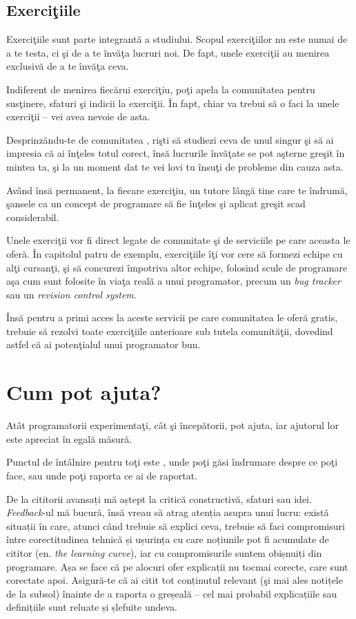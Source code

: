 {}
\subsection*{Exerciţiile}

Exerciţiile sunt parte integrantă a studiului. Scopul exerciţiilor nu
este numai de a te testa, ci şi de a te învăţa lucruri noi. De fapt,
unele exerciţii au menirea exclusivă de a te învăţa ceva.

Indiferent de menirea fiecărui exerciţiu, poţi apela la comunitatea
{\phpro} pentru susţinere, sfaturi şi indicii la exerciţii. În fapt,
chiar va trebui să o faci la unele exerciţii -- vei avea nevoie de asta.

Desprinzăndu-te de comunitatea \phpro, rişti să studiezi ceva de unul
singur şi să ai impresia că ai înţeles totul corect, însă lucrurile învăţate
se pot aşterne greşit în mintea ta, şi la un moment dat te vei lovi
tu însuţi de probleme din cauza asta.

Având însă permanent, la fiecare exerciţiu, un tutore lângă tine care te
îndrumă, şansele ca un concept de programare să fie înţeles şi aplicat
greşit scad considerabil.

Unele exerciţii vor fi direct legate de comunitate şi de serviciile pe care
aceasta le oferă. În capitolul patru de exemplu, exerciţiile îţi vor 
cere să formezi echipe cu alţi cursanţi, şi să concurezi împotriva altor echipe, folosind
scule de programare aşa cum sunt folosite în viaţa reală a unui programator,
precum un \textsl{bug tracker} sau un \textsl{revision control system}.

Însă pentru a primi acces la aceste servicii pe care comunitatea
{\phpro} le oferă gratis, trebuie să rezolvi toate exerciţiile anterioare
sub tutela comunităţii, dovedind astfel că ai potenţialul unui
programator bun.

{}
\section*{Cum pot ajuta?}
Atât programatorii experimentaţi, cât şi începătorii, pot ajuta,
iar ajutorul lor este apreciat în egală măsură.

Punctul de întâlnire pentru toţi este \phpro, unde poţi
găsi îndrumare despre ce poţi face, sau unde poţi raporta
ce ai de raportat.

De la cititorii avansați mă aștept la critică constructivă, sfaturi sau idei.
\textsl{Feedback}-ul mă bucură, însă vreau să atrag atenția asupra unui lucru:
există situații în care, atunci când trebuie să explici ceva, trebuie să
faci compromisuri între corectitudinea tehnică și ușurința cu care noțiunile
pot fi acumulate de cititor (en. \textsl{the learning curve}), iar cu compromisurile
suntem obișnuiți din programare. Așa se face că pe alocuri ofer explicații
nu tocmai corecte, care sunt corectate apoi. Asigură-te că ai citit tot conținutul
relevant (şi mai ales notițele de la subsol) înainte de a raporta o greșeală --
cel mai probabil explicațiile sau definițiile sunt reluate și șlefuite undeva.

